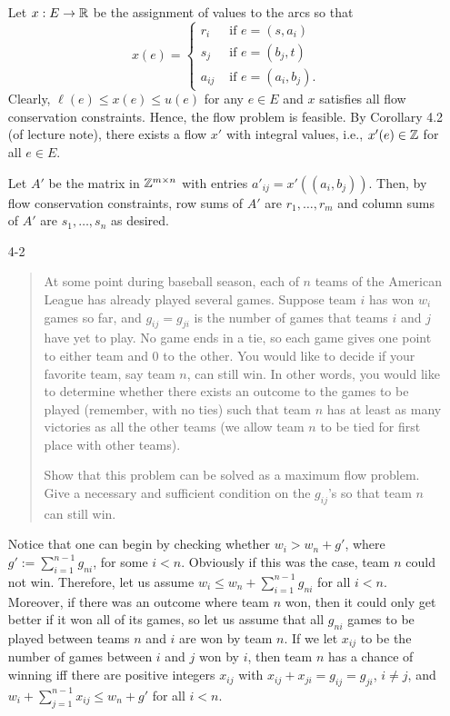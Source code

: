 \documentclass[12pt]{article}
\begin{document}
\begin{enumerate}
Let $x: E \to {\mathbb R}$ be the assignment of values to the arcs so that
$$
x(e) = \begin{cases}
r_i & \text{ if $e = (s, a_i)$} \\
s_j & \text{ if $e = (b_j, t)$} \\
a_{ij} & \text{ if $e = (a_i, b_j)$}.
\end{cases}
$$
Clearly, $\ell(e) \leq x(e) \leq u(e)$ for any $e \in E$ and $x$ satisfies all flow conservation constraints. Hence, the flow problem is feasible. By Corollary 4.2 (of lecture note), there exists a flow $x'$ with integral values, i.e., $x'(e) \in {\mathbb Z}$ for all $e \in E$.

Let $A'$ be the matrix in ${\mathbb Z}^{m \times n}$ with entries $a'_{ij} = x'((a_i,b_j))$. Then, by flow conservation constraints, row sums of $A'$ are $r_1,\dotsc,r_m$ and column sums of $A'$ are $s_1,\dotsc,s_n$ as desired.


\item[4-2]
\begin{quote}
At some point during baseball season, each of $n$ teams of the
American League has already played several games. Suppose team $i$ has
won $w_i$ games so far, and $g_{ij}=g_{ji}$ is the number of games
that teams $i$ and $j$ have yet to play. No game ends in a tie, so
each game gives one point to either team and 0 to the other. You would
like to decide if your favorite team, say team $n$, can
still win. In other words, you would like to determine whether there
exists an outcome to the games to be played (remember, with no ties)
such that team $n$ has at least as many victories as all the other
teams (we allow team $n$ to be tied for first place with other teams).

Show that this problem can be solved as a maximum flow problem. Give a necessary and sufficient condition on the $g_{ij}$'s so that team $n$ can still win.
\end{quote}

Notice that one can begin by checking whether $w_i > w_n + g'$, where $g' := \sum_{i=1}^{n-1}{g_{ni}}$, for some $i < n$.
Obviously if this was the case, team $n$ could not win. Therefore, let us assume $w_i \leq w_n + \sum_{i=1}^{n-1}{g_{ni}}$ for all $i<n$.
Moreover, if there was an outcome where team $n$ won, then it could only get better if it won all of its games,
so let us assume that all $g_{ni}$ games to be played between teams $n$ and $i$ are won by team $n$.
If we let $x_{ij}$ to be the number of games between $i$ and $j$ won by $i$, then team $n$
has a chance of winning iff there are positive integers $x_{ij}$ with $x_{ij} + x_{ji} = g_{ij} = g_{ji}$,
$i\neq j$, and $w_i + \sum_{j=1}^{n-1}{x_{ij}} \leq w_n + g'$ for all $i<n$.


\end{enumerate}
\end{document}
